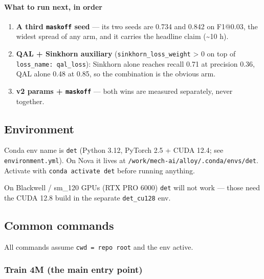 \documentclass[
  10pt,
]{article}
\providecommand{\tightlist}{%
  \setlength{\itemsep}{0pt}\setlength{\parskip}{0pt}}
\begin{document}
\paragraph{What to run next, in order}\label{what-to-run-next-in-order}

\begin{enumerate}
\def\labelenumi{\arabic{enumi}.}
\tightlist
\item
  \textbf{A third \texttt{maskoff} seed} --- its two seeds are 0.734 and
  0.842 on F1@0.03, the widest spread of any arm, and it carries the
  headline claim (\textasciitilde10 h).
\item
  \textbf{QAL + Sinkhorn auxiliary} (\texttt{sinkhorn\_loss\_weight}
  \textgreater{} 0 on top of \texttt{loss\_name:\ qal\_loss}): Sinkhorn
  alone reaches recall 0.71 at precision 0.36, QAL alone 0.48 at 0.85,
  so the combination is the obvious arm.
\item
  \textbf{v2 params + \texttt{maskoff}} --- both wins are measured
  separately, never together.
\end{enumerate}

\subsection{Environment}\label{environment}

Conda env name is \texttt{det} (Python 3.12, PyTorch 2.5 + CUDA 12.4;
see \texttt{environment.yml}). On Nova it lives at
\texttt{/work/mech-ai/alloy/.conda/envs/det}. Activate with
\texttt{conda\ activate\ det} before running anything.

On Blackwell / sm\_120 GPUs (RTX PRO 6000) \texttt{det} will not work
--- those need the CUDA 12.8 build in the separate \texttt{det\_cu128}
env.

\subsection{Common commands}\label{common-commands}

All commands assume \texttt{cwd\ =\ repo\ root} and the env active.

\subsubsection{Train 4M (the main entry
point)}\label{train-4m-the-main-entry-point}
\end{document}
